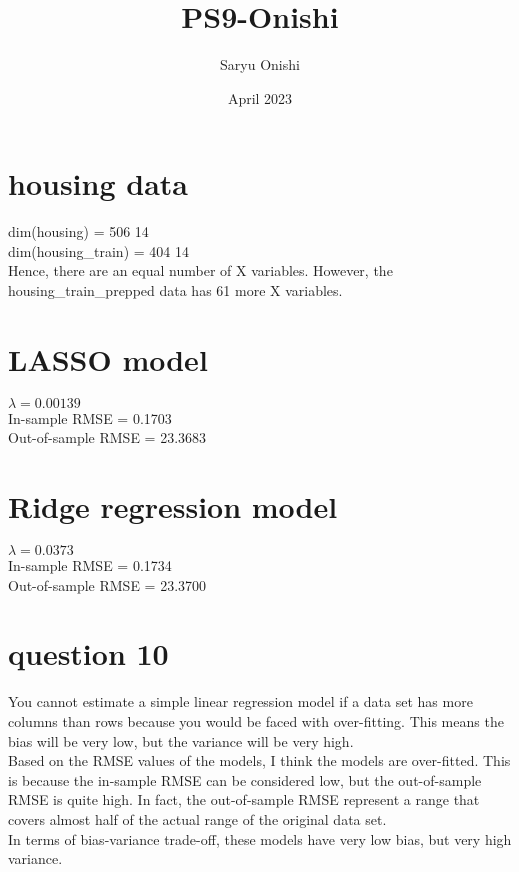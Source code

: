 \documentclass{article}
\begin{document}
\title{PS9-Onishi}
\author{Saryu Onishi}
\date{April 2023}
\maketitle

\section{housing data}
dim(housing) = 506 14 \\
dim(housing\_train) = 404 14 \\
Hence, there are an equal number of X variables. However, the housing\_train\_prepped data has 61 more X variables.

\section{LASSO model}
$\lambda = 0.00139$ \\
In-sample RMSE = 0.1703 \\
Out-of-sample RMSE = 23.3683 \\

\section{Ridge regression model}
$\lambda = 0.0373$ \\
In-sample RMSE = 0.1734 \\
Out-of-sample RMSE = 23.3700\\

\section{question 10}
You cannot estimate a simple linear regression model if a data set has more columns than rows because you would be faced with over-fitting. This means the bias will be very low, but the variance will be very high. \\
Based on the RMSE values of the models, I think the models are over-fitted. This is because the in-sample RMSE can be considered low, but the out-of-sample RMSE is quite high. In fact, the out-of-sample RMSE represent a range that covers almost half of the actual range of the original data set.\\
In terms of bias-variance trade-off, these models have very low bias, but very high variance. \\
\end{document}
